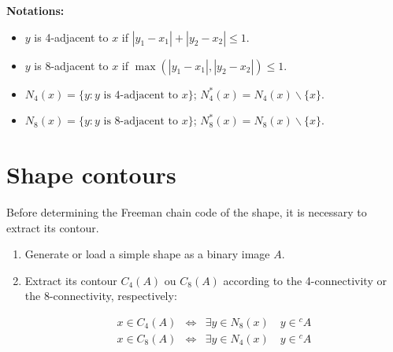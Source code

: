 \noindent \textbf{Notations:}
\begin{itemize}
	\item  $y$ is 4-adjacent to $x$ if $|y_1-x_1|+|y_2-x_2|\leq 1$.
	\item  $y$ is 8-adjacent to $x$ if $\max(|y_1-x_1|,|y_2-x_2|)\leq 1$.
	\item $N_4(x)=\{y:y\text{ is 4-adjacent to } x\}$; $N_4^*(x)=N_4(x)\backslash \{x\}$.
	\item $N_8(x)=\{y:y\text{ is 8-adjacent to } x\}$; $N_8^*(x)=N_8(x)\backslash \{x\}$.
\end{itemize}

{
	\makeatletter
	\renewcommand\fs@ruled{\def\@fs@cfont{\bfseries}\let\@fs@capt\floatc@ruled
		\def\@fs@pre{\hrule height.8pt depth0pt \kern2pt}%
		\def\@fs@post{\kern2pt\hrule\relax}%
		\def\@fs@mid{\vskip2pt}%
		\let\@fs@iftopcapt\iftrue}
	\makeatother
\begin{figure}[H]
\centering
{} \hspace*{1.5cm}
\end{figure}
}
%

\section{Shape contours}
Before determining the Freeman chain code of the shape, it is necessary to extract its contour.
\begin{qbox}
\begin{enumerate}
	\item Generate or load a simple shape as a binary image $A$.
	\item Extract its contour $C_4(A)$ ou $C_8(A)$ according to the 4-con\-nectivity or the 8-con\-nectivity, respectively:
	
	\begin{eqnarray*}
	x\in C_4(A)&\Leftrightarrow&\exists y\in N_8(x)\quad y\in {^c}\!A\\
	x\in C_8(A)&\Leftrightarrow&\exists y\in N_4(x)\quad y\in {^c}\!A
	\end{eqnarray*}
	 
\end{enumerate}
\end{qbox}

